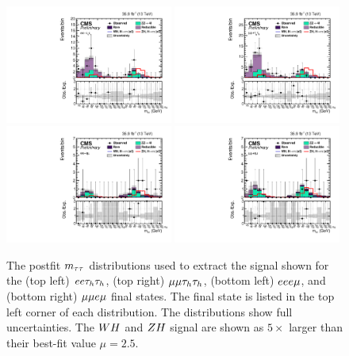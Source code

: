 \begin{figure}[h!]
 \begin{center}
  \includegraphics[width=0.49\textwidth]{higgs_to_taus_vh/plots/zh/eett_postfit.pdf}
  \includegraphics[width=0.49\textwidth]{higgs_to_taus_vh/plots/zh/mmtt_postfit.pdf}
  \includegraphics[width=0.49\textwidth]{higgs_to_taus_vh/plots/zh/eeem_postfit.pdf}
  \includegraphics[width=0.49\textwidth]{higgs_to_taus_vh/plots/zh/emmm_postfit.pdf}
 \end{center}
 \caption{The postfit $m_{\tau\tau}$ distributions used to extract the signal shown
  for the (top left) $ee\tau_{h}\tau_{h}$, (top right) $\mu\mu\tau_{h}\tau_{h}$, 
  (bottom left) $eee\mu$, and (bottom right) $\mu\mu e\mu$
  final states. The final state is listed in the
  top left corner of each distribution.
  The distributions show full uncertainties.
  The $WH$ and $ZH$ signal are shown as $5\times$ larger than their best-fit
  value $\mu = 2.5$.
 }
 \label{fig:zh_all_eight2}
\end{figure}

